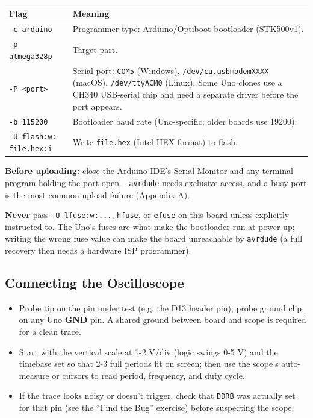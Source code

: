 \documentclass[11pt]{article}
\begin{document}
\begin{center}
\begin{tabular}{@{}p{4.2cm}p{8.2cm}@{}}
\toprule
\textbf{Flag} & \textbf{Meaning} \\
\midrule
\texttt{-c arduino} & Programmer type: Arduino/Optiboot bootloader (STK500v1). \\
\texttt{-p atmega328p} & Target part. \\
\texttt{-P <port>} & Serial port: \texttt{COM5} (Windows), \texttt{/dev/cu.usbmodemXXXX}
(macOS), \texttt{/dev/ttyACM0} (Linux). Some Uno clones use a CH340 USB-serial chip
and need a separate driver before the port appears. \\
\texttt{-b 115200} & Bootloader baud rate (Uno-specific; older boards use 19200). \\
\texttt{-U flash:w:} \texttt{file.hex:i} & Write \texttt{file.hex} (Intel HEX format)
to flash. \\
\bottomrule
\end{tabular}
\end{center}

\textbf{Before uploading:} close the Arduino IDE's Serial Monitor and any terminal
program holding the port open -- \texttt{avrdude} needs exclusive access, and a busy
port is the most common upload failure (Appendix A).

\textbf{Never} pass \texttt{-U lfuse:w:...}, \texttt{hfuse}, or \texttt{efuse} on this
board unless explicitly instructed to. The Uno's fuses are what make the bootloader
run at power-up; writing the wrong fuse value can make the board unreachable by
\texttt{avrdude} (a full recovery then needs a hardware ISP programmer).

\subsection*{Connecting the Oscilloscope}
\begin{itemize}[leftmargin=*,nosep]
  \item Probe tip on the pin under test (e.g. the D13 header pin); probe ground clip
        on any Uno \textbf{GND} pin. A shared ground between board and scope is
        required for a clean trace.
  \item Start with the vertical scale at 1-2 V/div (logic swings 0-5 V) and the
        timebase set so that 2-3 full periods fit on screen; then use the scope's
        auto-measure or cursors to read period, frequency, and duty cycle.
  \item If the trace looks noisy or doesn't trigger, check that \texttt{DDRB} was
        actually set for that pin (see the ``Find the Bug'' exercise) before
        suspecting the scope.
\end{itemize}
\end{document}
